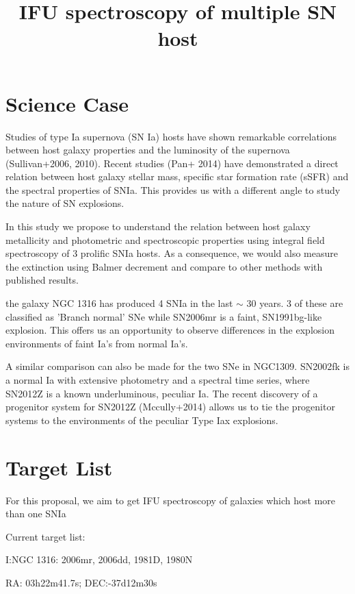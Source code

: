 \documentclass{article}
\begin{document}
\title{IFU spectroscopy of multiple SN host}
\maketitle

\section{Science Case}
Studies of type Ia supernova (SN Ia) hosts have shown remarkable correlations between host galaxy properties and the luminosity of the supernova (Sullivan+2006, 2010). Recent studies (Pan+ 2014) have demonstrated a direct relation between host galaxy stellar mass, specific star formation rate (sSFR) and the spectral properties of SNIa. This provides us with a different angle to study the nature of SN explosions.

In this study we propose to understand the relation between host galaxy metallicity and photometric and spectroscopic properties using integral field spectroscopy of 3 prolific SNIa hosts. As a consequence, we would also measure the extinction using Balmer decrement and compare to other methods with published results. 

the galaxy NGC 1316 has produced 4 SNIa in the last $\sim$ 30 years. 3 of these are classified as 'Branch normal' SNe while SN2006mr is a faint, SN1991bg-like explosion. This offers us an opportunity to observe differences in the explosion environments of faint Ia's from normal Ia's.

A similar comparison can also be made for the two SNe in NGC1309. SN2002fk is a normal Ia with extensive photometry and a spectral time series, where SN2012Z is a known underluminous, peculiar Ia. The recent discovery of a progenitor system for SN2012Z (Mccully+2014) allows us to tie the progenitor systems to the environments of the peculiar Type Iax explosions. 



 
\section{Target List}
For this proposal, we aim to get IFU spectroscopy of galaxies which host more than one SNIa

Current target list:



I:NGC 1316: 2006mr, 2006dd, 1981D, 1980N

RA: 03h22m41.7s; DEC:-37d12m30s
\end{document}
